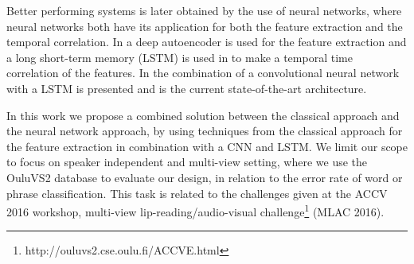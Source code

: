 Better performing systems is later obtained by the use of neural networks, where neural networks both have its application for both the feature extraction and the temporal correlation.
In \cite{Ngiam2011} a deep autoencoder is used for the feature extraction and a long short-term memory (LSTM) is used in \cite{Wand2016} to make a temporal time correlation of the features.
In \cite{Lee} the combination of a convolutional neural network with a LSTM is presented and is the current state-of-the-art architecture.

In this work we propose a combined solution between the classical approach and the neural network approach, by using techniques from the classical approach for the feature extraction in combination with a CNN and LSTM.
We limit our scope to focus on speaker independent and multi-view setting, where we use the OuluVS2 database\cite{Anina2015} to evaluate our design, in relation to the error rate of word or phrase classification.
This task is related to the challenges given at the ACCV 2016 workshop, multi-view lip-reading/audio-visual challenge\footnote{http://ouluvs2.cse.oulu.fi/ACCVE.html} (MLAC 2016).
